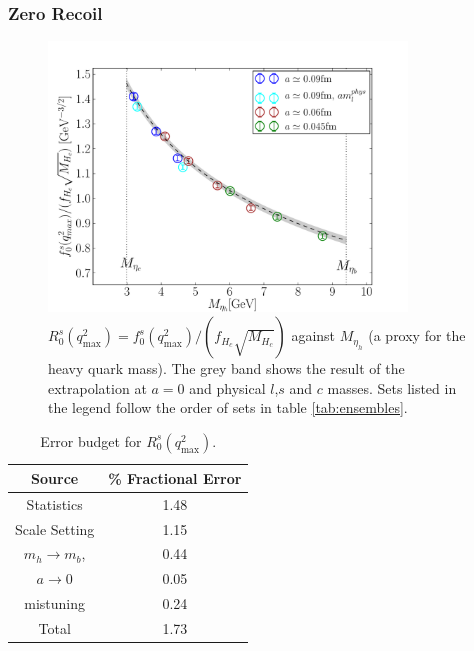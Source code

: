 \subsubsection{Zero Recoil}

\begin{figure}[htb!]
  \begin{center}
  \hspace{-10pt}
  \includegraphics[width=0.85\textwidth]{images/BsDs/ratio/f0fHc_vsmh.pdf}
  \caption{ $R_0^s(q^2_{\text{max}}) = f_0^s(q^2_{\text{max}})/(f_{H_c}\sqrt{M_{H_c}})$ against $M_{\eta_h}$ (a proxy for the heavy quark mass). The grey band shows the result of the extrapolation at $a=0$ and physical $l$,$s$ and $c$ masses. Sets listed in the legend follow the order of sets in table \ref{tab:ensembles}. \label{fig:ratioq2max}}
    \end{center}
\end{figure}

\begin{table}[htb!]
  \begin{center}
    \begin{tabular}{c c}
      \hline
      Source & \% Fractional Error \\ [0.5ex]
      \hline
      Statistics & 1.48  \\ [1ex]
      Scale Setting & 1.15  \\ [1ex]
      $m_h \to m_b$, & 0.44  \\ [1ex]
      $a\to 0$ & 0.05  \\ [1ex]
      mistuning & 0.24 \\ [1ex]
      \hline
      Total & 1.73 \\ [1ex]
      \hline
    \end{tabular}
  \end{center}
  \caption{Error budget for $R_0^s(q^2_{\text{max}})$.\label{ratioq2max_budget}}
\end{table}

